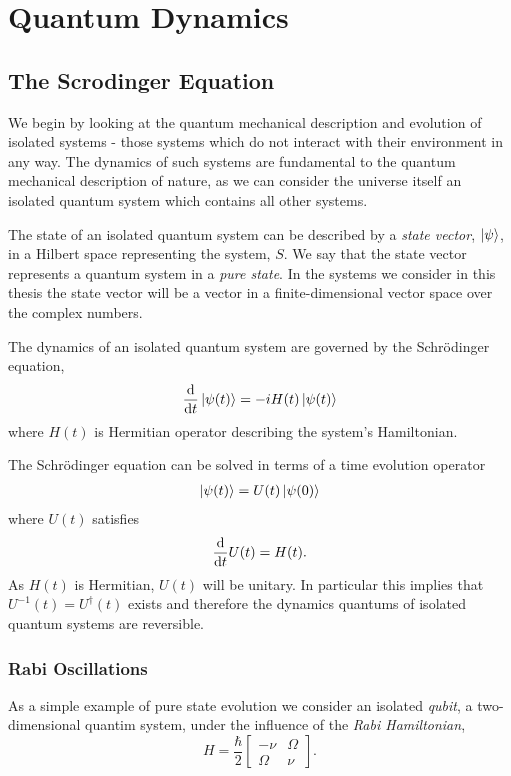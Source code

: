 \chapter{Quantum Dynamics} 
\label{ch:QuantumDynamics}

\section{The Scrodinger Equation}

We begin by looking at the quantum mechanical description and evolution of isolated systems - those systems which do not interact with their environment in any way. The dynamics of such systems are fundamental to the quantum mechanical description of nature, as we can consider the universe itself an isolated quantum system which contains all other systems. 

The state of an isolated quantum system can be described by a \textit{state vector}, $\left\vert\psi\right\rangle$, in a Hilbert space representing the system, $S$. We say that the state vector represents a quantum system in a \textit{pure state}. In the systems we consider in this thesis the state vector will be a vector in a finite-dimensional vector space over the complex numbers. 

The dynamics of an isolated quantum system are governed by the Schr\"odinger equation,
\begin{align}
  \label{qd:schrodinger_eq}
  \frac{\mathrm{d}}{\mathrm{d}t} \left\vert\psi(t)\right\rangle = -i H(t) \left\vert\psi(t)\right\rangle
\end{align}
where $H(t)$ is Hermitian operator describing the system's Hamiltonian.

The Schr\"odinger equation can be solved in terms of a time evolution operator
\begin{align}
  \left\vert\psi(t)\right\rangle = U(t)\left\vert\psi(0)\right\rangle
\end{align}
where $U(t)$ satisfies
\begin{align}
  \frac{\mathrm{d}}{\mathrm{d}t} U(t) = H(t).
\end{align}
As $H(t)$ is Hermitian, $U(t)$ will be unitary. In particular this implies that $U^{-1}(t) = U^\dagger(t)$ exists and therefore the dynamics quantums of isolated quantum systems are reversible.

\subsection{Rabi Oscillations}

As a simple example of pure state evolution we consider an isolated \textit{qubit}, a two-dimensional quantim system, under the influence of the \textit{Rabi Hamiltonian},
\begin{equation} \label{rabi_hamiltonian}
  H = \frac{\hbar}{2}
\begin{bmatrix}
  -\nu & \Omega \\
  \Omega & \nu 
\end{bmatrix}.
\end{equation}

